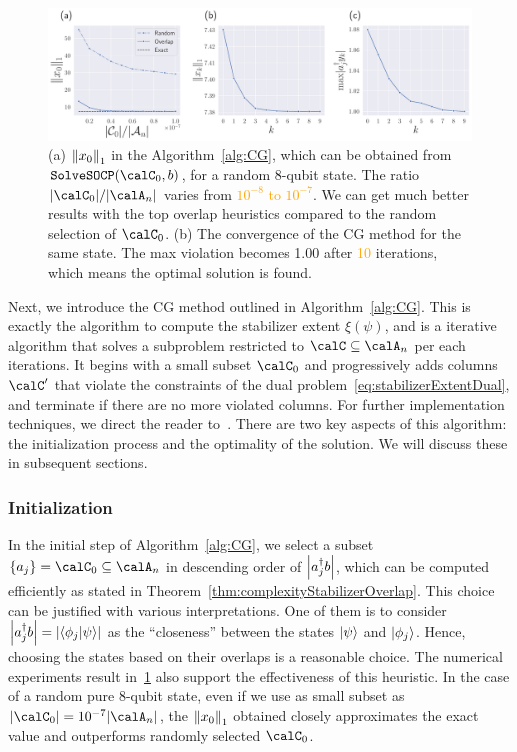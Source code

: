 \documentclass[a4paper, onecolumn, 11pt, longbibliography]{quantumarticle}
\newcommand{\orange}[1]{\textcolor{orange}{#1}}
\begin{document}
\begin{figure}[t]
  \centering
  \includegraphics[width=\columnwidth]{../../image/CG_7.pdf}
  \caption{
    (a) $\norm{x_0}_1$ in the Algorithm~\ref{alg:CG},
    which can be obtained from $\texttt{SolveSOCP}(\calC_0, b)$,
    for a random 8-qubit state.
    The ratio $\abs{\calC_0}/\abs{\calA_n}$
    varies from \orange{$10^{-8}$ to $10^{-7}$}.
    We can get much better results
    with the top overlap heuristics
    compared to the random selection of $\calC_0$.
    (b) The convergence of the CG method
    for the same state.
    The max violation becomes 1.00
    after \orange{10} iterations, which means
    the optimal solution is found.
  }
  \label{fig:CG}
\end{figure}

Next, we introduce the CG method
outlined in Algorithm~\ref{alg:CG}.
This is exactly the algorithm to compute
the stabilizer extent $\xi(\psi)$,
and is a iterative algorithm that solves
a subproblem restricted to $\calC \subseteq \calA_n$
per each iterations.
It begins with a small subset $\calC_0$
and progressively adds columns $\calC'$
that violate the constraints of the dual problem~\eqref{eq:stabilizerExtentDual},
and terminate if there are no more violated columns.
For further implementation techniques,
we direct the reader
to~\cite{hamaguchiHandbookEfficientlyQuantifying2023}.
There are two key aspects of this algorithm:
the initialization process and
the optimality of the solution.
We will discuss these
in subsequent sections.

\subsubsection{Initialization}

In the initial step of Algorithm~\ref{alg:CG},
we select a subset $\{a_j\} = \calC_0 \subseteq \calA_n$
in descending order of $\abs{a_j^\dagger b}$,
which can be computed efficiently
as stated in Theorem~\ref{thm:complexityStabilizerOverlap}.
This choice can be justified with various interpretations.
One of them is to consider
$\abs{a_j^\dagger b} = \abs{\braket{\phi_j}{\psi}}$
as the ``closeness'' between the states
$\ket{\psi}$ and $\ket{\phi_j}$.
Hence, choosing the states based on their overlaps
is a reasonable choice.
The numerical experiments result
in~\ref{fig:CG}
also support the effectiveness of this heuristic.
In the case of a random pure 8-qubit state,
even if we use as small subset as
$\abs{\calC_0} = 10^{-7} \abs{\calA_n}$,
the $\norm{x_0}_1$ obtained closely approximates the exact value
and outperforms randomly selected $\calC_0$.
\end{document}
